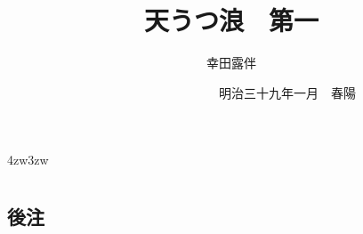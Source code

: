 \documentclass[
uplatex                                     ,%
dvipdfmx                                    ,%
book                                        ,%
tate                                        ,%
twoside                                     ,%
paper                       = a5paper       ,%
open_bracket_pos            = nibu_tentsuki ,%
hanging_punctuation                         ,%
openany                                     ,%
jafontsize                  = 12pt          ,%
]{jlreq}
\title{\Huge 天うつ浪　{\Large 第一}}
\author{幸田露伴}
\date{　　　　　　　　　{\small 明治三十九年一月}　春陽{\換字{堂}}}
\begin{document}
\maketitle
\pagestyle{myheadings}
\newcommand{\Entry}[1]{
	\section*{#1}
	\markboth{#1}{#1}
	\setcounter{equation}{0}}
\begin{indentation}{4zw}{3zw}
\parindent=0pt

\chapter*{}










































\end{indentation}

\section*{後注}
\theendnotes
\end{document}
